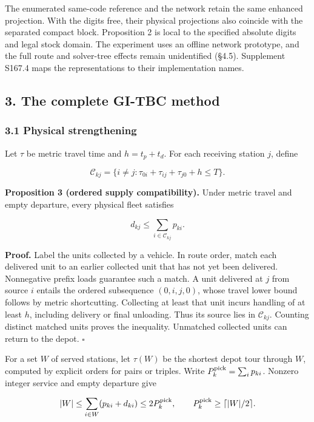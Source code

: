 \documentclass[
  american,
  11pt,
]{article}
\begin{document}
The enumerated same-code reference and the network retain the same
enhanced projection. With the digits free, their physical projections
also coincide with the separated compact block. Proposition 2 is local
to the specified absolute digits and legal stock domain. The experiment
uses an offline network prototype, and the full route and solver-tree
effects remain unidentified (§4.5). Supplement S167.4 maps the
representations to their implementation names.

\subsection{3. The complete GI-TBC
method}\label{the-complete-gi-tbc-method}

\subsubsection{3.1 Physical strengthening}\label{physical-strengthening}

Let \(\tau\) be metric travel time and \(h=t_p+t_d\). For each receiving
station \(j\), define

\[
\mathcal C_{kj}=\{i\ne j:\tau_{0i}+\tau_{ij}+\tau_{j0}+h\le T\}.
\]


\textbf{Proposition 3 (ordered supply compatibility).} Under metric
travel and empty departure, every physical fleet satisfies

\[
d_{kj}\le\sum_{i\in\mathcal C_{kj}}p_{ki}.
\]

\textbf{Proof.} Label the units collected by a vehicle. In route order,
match each delivered unit to an earlier collected unit that has not yet
been delivered. Nonnegative prefix loads guarantee such a match. A unit
delivered at \(j\) from source \(i\) entails the ordered subsequence
\((0,i,j, 0)\), whose travel lower bound follows by metric shortcutting.
Collecting at least that unit incurs handling of at least \(h\),
including delivery or final unloading. Thus its source lies in
\(\mathcal C_{kj}\). Counting distinct matched units proves the
inequality. Unmatched collected units can return to the depot.
\(\square\)

For a set \(W\) of served stations, let \(\tau(W)\) be the shortest
depot tour through \(W\), computed by explicit orders for pairs or
triples. Write \(P_k^{\rm pick}=\sum_i p_{ki}\). Nonzero integer service
and empty departure give

\[
|W|\le\sum_{i\in W}(p_{ki}+d_{ki})\le2P_k^{\rm pick},\qquad
P_k^{\rm pick}\ge\lceil |W|/2\rceil.
\]
\end{document}
